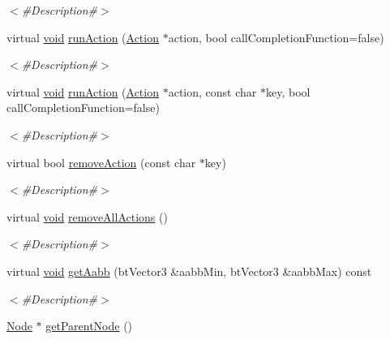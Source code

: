 \begin{DoxyCompactItemize}
\begin{DoxyCompactList}\small\item\em $<$\#\+Description\#$>$ \end{DoxyCompactList}\item 
virtual \mbox{\hyperlink{_thread_8h_af1e856da2e658414cb2456cb6f7ebc66}{void}} \mbox{\hyperlink{classnjli_1_1_node_a5674da852b950cc581fd22bc0c309b5f}{run\+Action}} (\mbox{\hyperlink{classnjli_1_1_action}{Action}} $\ast$action, bool call\+Completion\+Function=false)
\begin{DoxyCompactList}\small\item\em $<$\#\+Description\#$>$ \end{DoxyCompactList}\item 
virtual \mbox{\hyperlink{_thread_8h_af1e856da2e658414cb2456cb6f7ebc66}{void}} \mbox{\hyperlink{classnjli_1_1_node_a4a5ab73e783b102ffa0c5af0d118e207}{run\+Action}} (\mbox{\hyperlink{classnjli_1_1_action}{Action}} $\ast$action, const char $\ast$key, bool call\+Completion\+Function=false)
\begin{DoxyCompactList}\small\item\em $<$\#\+Description\#$>$ \end{DoxyCompactList}\item 
virtual bool \mbox{\hyperlink{classnjli_1_1_node_ae469bbf7d36fd0ea3b78ff9ee8cc6dee}{remove\+Action}} (const char $\ast$key)
\begin{DoxyCompactList}\small\item\em $<$\#\+Description\#$>$ \end{DoxyCompactList}\item 
virtual \mbox{\hyperlink{_thread_8h_af1e856da2e658414cb2456cb6f7ebc66}{void}} \mbox{\hyperlink{classnjli_1_1_node_ad497289960419c904082516aab4ab551}{remove\+All\+Actions}} ()
\begin{DoxyCompactList}\small\item\em $<$\#\+Description\#$>$ \end{DoxyCompactList}\item 
virtual \mbox{\hyperlink{_thread_8h_af1e856da2e658414cb2456cb6f7ebc66}{void}} \mbox{\hyperlink{classnjli_1_1_node_ace3971fd38146ecf3b501b5a71246b55}{get\+Aabb}} (bt\+Vector3 \&aabb\+Min, bt\+Vector3 \&aabb\+Max) const
\begin{DoxyCompactList}\small\item\em $<$\#\+Description\#$>$ \end{DoxyCompactList}\item 
\mbox{\hyperlink{classnjli_1_1_node}{Node}} $\ast$ \mbox{\hyperlink{classnjli_1_1_node_a65ab991b8728c265d6d68d870450c1f3}{get\+Parent\+Node}} ()

\end{DoxyCompactItemize}
